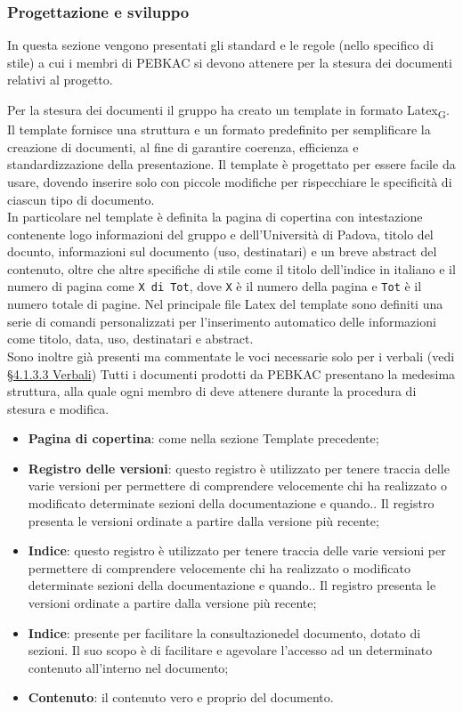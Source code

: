 \subsubsection{Progettazione e sviluppo}
In questa sezione vengono presentati gli standard e le regole (nello specifico di stile) a cui i membri di PEBKAC si devono attenere per la stesura dei documenti relativi al progetto.

Per la stesura dei documenti il gruppo ha creato un template in formato Latex\textsubscript{G}. Il template fornisce una struttura e un formato predefinito per semplificare la creazione di documenti, al fine di garantire coerenza, efficienza e standardizzazione della presentazione. 
Il template è progettato per essere facile da usare, dovendo inserire solo con piccole modifiche per rispecchiare le specificità di ciascun tipo di documento.\\
In particolare nel template è definita la pagina di copertina con intestazione contenente logo informazioni del gruppo e dell'Università di Padova, titolo del docunto, informazioni sul documento (uso, destinatari) e un breve abstract del contenuto, oltre che altre specifiche di stile come il titolo dell'indice in italiano e il numero di pagina come \texttt{X di Tot}, dove \texttt{X} è il numero della pagina e \texttt{Tot} è il numero totale di pagine.
Nel principale file Latex del template sono definiti una serie di comandi personalizzati per l'inserimento automatico delle informazioni come titolo, data, uso, destinatari e abstract. \\
Sono inoltre già presenti ma commentate le voci necessarie solo per i verbali (vedi  \hyperref[sec: struttura verbali]{§4.1.3.3 Verbali})
Tutti i documenti prodotti da PEBKAC presentano la medesima struttura, alla quale ogni membro di deve attenere durante la procedura di stesura e modifica.
\begin{itemize}
    \item \textbf{Pagina di copertina}: come nella sezione Template precedente;
    \item \textbf{Registro delle versioni}: questo registro è utilizzato per tenere traccia delle varie versioni per permettere di comprendere velocemente chi ha realizzato o modificato determinate sezioni della documentazione e quando.. Il registro presenta le versioni ordinate a partire dalla versione più recente;
     \item \textbf{Indice}: questo registro è utilizzato per tenere traccia delle varie versioni per permettere di comprendere velocemente chi ha realizzato o modificato determinate sezioni della documentazione e quando.. Il registro presenta le versioni ordinate a partire dalla versione più recente;
     \item \textbf{Indice}: presente per facilitare la consultazionedel documento, dotato di sezioni. Il suo scopo è di facilitare e agevolare l’accesso ad un determinato contenuto all'interno nel documento;
     \item \textbf{Contenuto}: il contenuto vero e proprio del documento.
\end{itemize}


